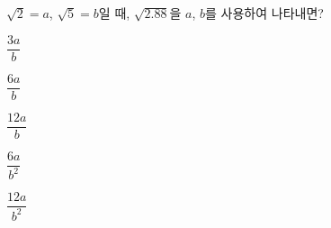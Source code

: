 $\sqrt{2}=a$, $\sqrt{5}=b$일 때, $\sqrt{2.88}$을 $a$, $b$를 사용하여 나타내면?
\begin{choices32}{\rule[-3ex]{0pt}{8ex}$\dfrac{3a}{b}$}{\rule[-3ex]{0pt}{8ex}$\dfrac{6a}{b}$}{\rule[-3ex]{0pt}{8ex}$\dfrac{12a}{b}$}{\rule[-3ex]{0pt}{8ex}$\dfrac{6a}{b^2}$}{\rule[-3ex]{0pt}{8ex}$\dfrac{12a}{b^2}$}\end{choices32}
